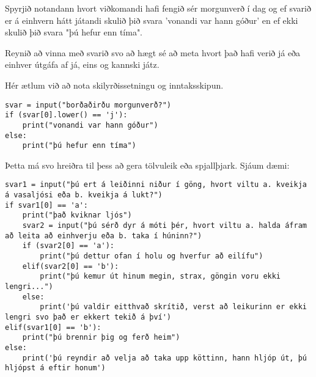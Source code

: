 \begin{exercise}\label{exp5}
Spyrjið notandann hvort viðkomandi hafi fengið sér morgunverð í dag og ef svarið er á einhvern hátt játandi skulið þið svara 'vonandi var hann góður' en ef ekki skulið þið svara "þú hefur enn tíma".

Reynið að vinna með svarið svo að hægt sé að meta hvort það hafi verið já eða einhver útgáfa af já, eins og kannski játz.
\end{exercise}
\begin{Answer}[ref={exp5}]
Hér ætlum við að nota skilyrðissetningu og inntaksskipun.
	\begin{lstlisting}
svar = input("borðaðirðu morgunverð?")
if (svar[0].lower() == 'j'):
	print("vonandi var hann góður")
else:
	print("þú hefur enn tíma")\end{lstlisting}

Þetta má svo hreiðra til þess að gera tölvuleik eða spjallþjark.
Sjáum dæmi:
\begin{lstlisting}
svar1 = input("þú ert á leiðinni niður í göng, hvort viltu a. kveikja á vasaljósi eða b. kveikja á lukt?")
if svar1[0] == 'a':
	print("það kviknar ljós")
	svar2 = input("þú sérð dyr á móti þér, hvort viltu a. halda áfram að leita að einhverju eða b. taka í húninn?")
	if (svar2[0] == 'a'):
		print("þú dettur ofan í holu og hverfur að eilífu")
	elif(svar2[0] == 'b'):
		print("þú kemur út hinum megin, strax, göngin voru ekki lengri...")
	else:
		print('þú valdir eitthvað skrítið, verst að leikurinn er ekki lengri svo það er ekkert tekið á því')
elif(svar1[0] == 'b'):
	print("þú brennir þig og ferð heim")
else:
	print('þú reyndir að velja að taka upp köttinn, hann hljóp út, þú hljópst á eftir honum')\end{lstlisting}

\end{Answer}

